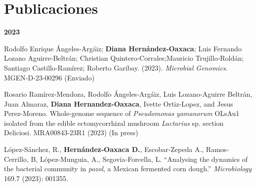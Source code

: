 \documentclass[11pt,a4paper,]{awesome-cv}
\begin{document}
\begin{cventries}
{\begin{cvitems}
\end{cvitems}}
\end{cventries}

\hypertarget{publicaciones}{%
\section{Publicaciones}\label{publicaciones}}

\footnotesize
\setlength{\leftskip}{0cm}

\textbf{2023}

\setlength{\leftskip}{1cm}

Rodolfo Enrique Ángeles‐Argáiz; \textbf{Diana Hernández‐Oaxaca}; Luis
Fernando Lozano Aguirre‐Beltrán; Christian Quintero‐Corrales;Mauricio
Trujillo‐Roldán; Santiago Castillo‐Ramírez; Roberto Garibay. (2023).
\emph{Microbial Genomics}. MGEN‐D‐23‐00296 (Enviado)

Rosario Ramírez‐Mendoza, Rodolfo Ángeles‐Argáiz, Luis Lozano‐Aguirre
Beltrán, Juan Almaraz, \textbf{Diana Hernandez‐Oaxaca}, Ivette
Ortiz‐Lopez, and Jesus Perez‐Moreno. Whole‐genome sequence of
\emph{Pseudomonas yamanorum} OLsAu1 isolated from the edible
ectomycorrhizal mushroom \emph{Lactarius} sp. section Deliciosi.
MRA00843‐23R1 (2023) (In press)

López‐Sánchez, R., \textbf{Hernández‐Oaxaca D.}, Escobar‐Zepeda A.,
Ramos‐Cerrillo, B, López‐Munguia, A., Segovia‐Forcella, L. ``Analysing
the dynamics of the bacterial community in \emph{pozol}, a Mexican
fermented corn dough.'' \emph{Microbiology} 169.7 (2023): 001355.
\end{document}
